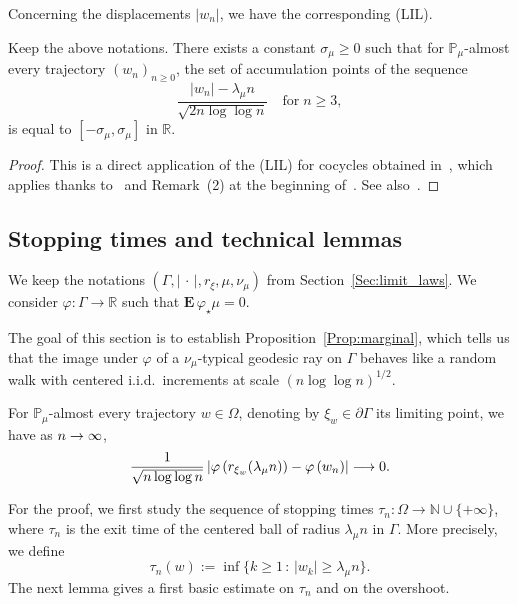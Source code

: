 \documentclass[10pt]{amsart}
\theoremstyle{definition}\newtheorem{defi}[theo]{Definition}\newtheorem{rema}[theo]{Remark}\newtheorem{exam}[theo]{Example}\newtheorem{exem}[theo]{Example}\newtheorem{nota}[theo]{Notation}
\newcommand{\N}{\mathbb{N}}
\newcommand{\R}{\mathbb{R}}
\renewcommand{\Pr}{\mathbb{P}}
\newcommand{\Eb}{\mathbf{E}\,}
\renewcommand{\(}{\left(}
\renewcommand{\)}{\right)}
\renewcommand*{\to}{\mathchoice{\longrightarrow}{\rightarrow}{\rightarrow}{\rightarrow}}
\begin{document}
Concerning the displacements $|w_n|$, we have the corresponding (LIL).

\begin{prop}\label{Prop:LILdistance}
Keep the above notations.
There exists a constant $\sigma_\mu\ge 0$ such that for $\Pr_{\mu}$-almost every trajectory $(w_n)_{n\geq 0}$, the set of accumulation points of the sequence
\[
\frac{|w_n|-\lambda_\mu n}{\sqrt{2n\log \log n}} \quad \text{for}\; n\geq 3,
\]
is equal to $[-\sigma_\mu, \sigma_\mu]$ in $\R$.
\end{prop}
\begin{proof}
This is a direct application of the (LIL) for cocycles obtained in~\cite[Proposition~A.5]{BenardWinding}, which applies thanks to~\cite[Section~3.1]{BenardWinding} and Remark~(2) at the beginning of~\cite[Appendix~A]{BenardWinding}. See also~\cite{BjorklundCLT, BenoistQuintCLThyperbolic, ChoiCLT}.
\end{proof}



\subsection{Stopping times and technical lemmas}

We keep the notations $(\Gamma, |\,\cdot\,|, r_{\xi}, \mu, \nu_{\mu})$ from Section~\ref{Sec:limit_laws}. We consider $\varphi : \Gamma\rightarrow \R$ such that $\Eb \varphi_{\star}\mu=0$.



The goal of this section is to establish Proposition~\ref{Prop:marginal}, which tells us that the image under $\varphi$ of a $\nu_{\mu}$-typical geodesic ray on $\Gamma$ behaves like a random walk with centered i.i.d.\ increments at scale $(n \log \log n)^{1/2}$.


\begin{prop}\label{Prop:marginal}
For $\Pr_\mu$-almost every trajectory $w\in \Omega$, denoting by $\xi_{w} \in \partial \Gamma$ its limiting point, we have as $n \to \infty$,
\[
\frac{1}{\sqrt{n\log \log n}} \left|\varphi\left(r_{\xi_{w}}(\lambda_\mu n)\right)-\varphi\left(w_n\right)\right| \to 0.
\]
\end{prop}

For the proof, we first study the sequence of stopping times $\tau_{n}: \Omega\rightarrow \N\cup \{+\infty\}$, where $\tau_{n}$ is the exit time of the centered ball of radius $\lambda_{\mu}n$ in $\Gamma$. More precisely, we define
\[
\tau_n(w) :=\inf\{k \ge 1 \, : \, |w_{k}| \ge \lambda_\mu n\}.
\]
The next lemma gives a first basic estimate on $\tau_{n}$ and on the overshoot.
\end{document}
